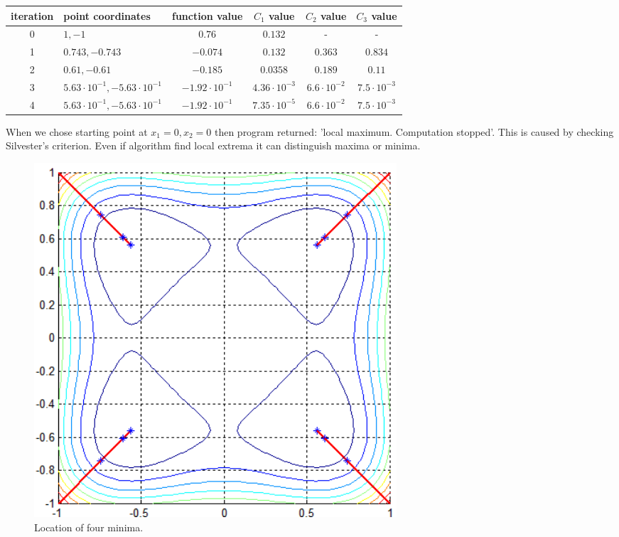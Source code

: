 \documentclass[12pt]{article}
\begin{document}
	\begin{table}[H]
		\begin{tabularx}{\textwidth}{c|X|c|c|c|c|}
			iteration & point coordinates & function value & $C_1$ value & $C_2$ value & $C_3$ value\\
			\hline	
			0 & $1, -1$ & $0.76$ & $0.132$ & - & - \\
			\hline					
			1 & $0.743, -0.743$ & $-0.074$ & $0.132$ & $0.363$ & $0.834$ \\ 
			\hline 
			2 & $0.61, -0.61$ & $-0.185$ & $0.0358$ & $0.189$ & $0.11$ \\ 
			\hline
			3 & $5.63\cdot10^{-1}, -5.63\cdot10^{-1}$  & $-1.92\cdot10^{-1}$ & $4.36\cdot10^{-3}$ & $6.6\cdot10^{-2}$ & $7.5\cdot10^{-3}$ \\ 
			\hline
			4 & $5.63\cdot10^{-1}, -5.63\cdot10^{-1}$  & $-1.92\cdot10^{-1}$ &
			$7.35\cdot10^{-5}$ & $6.6\cdot10^{-2}$ & $7.5\cdot10^{-3}$ \\ \hline
		\end{tabularx}		 
	\end{table}
	When we chose starting point at $x_1=0, x_2=0$ then program returned: 'local maximum. Computation stopped'. This is caused by checking Silvester's criterion. Even if algorithm find local extrema it can distinguish maxima or minima. 
	
	\begin{figure}[H]
		\includegraphics[width=13.5cm]{four_results.png}
		\caption{Location of four minima.}
	\end{figure}
\end{document}

